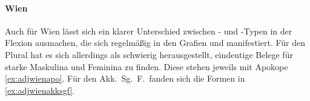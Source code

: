 
\paragraph{Wien}
\label{par:adjwien}
Auch für Wien lässt sich ein klarer Unterschied zwischen - und
-Typen in der Flexion ausmachen, die sich regelmäßig in den Grafien
 und  manifestiert. Für den Plural hat es sich
allerdings als schwierig herausgestellt, eindeutige Belege für starke Maskulina
und Feminina zu finden. Diese stehen jeweils mit Apokope \cref{ex:adjwienapo}.
Für den Akk.\ Sg.\ F.\ fanden sich die Formen in \cref{ex:adjwienakksgf}.

